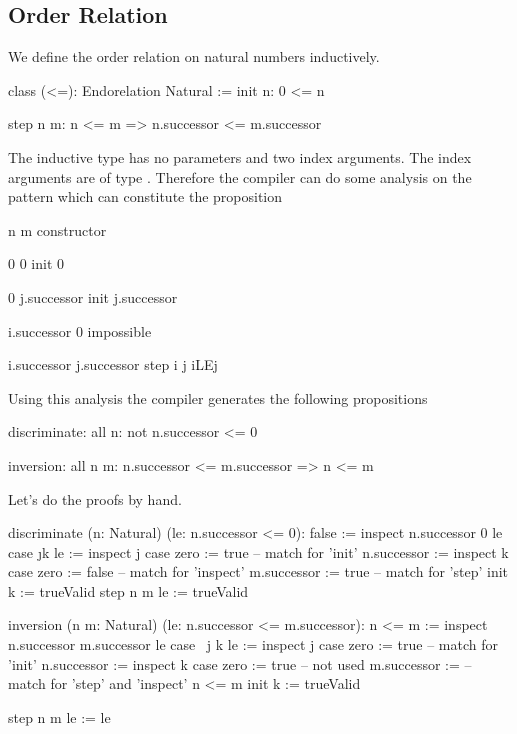 \subsection{Order Relation}

We define the order relation on natural numbers inductively.

\begin{alba}
    class
        (<=): Endorelation Natural
    :=
        init n:
            0 <= n

        step n m:
            n <= m
            => n.successor <= m.successor
\end{alba}

The inductive type has no parameters and two index arguments. The index
arguments are of type . Therefore the compiler can do some analysis
on the pattern which can constitute the proposition 

\begin{alba}
        n               m                   constructor

        0               0                   init 0

        0               j.successor         init j.successor

        i.successor     0                   impossible

        i.successor     j.successor         step i j iLEj
\end{alba}
%
Using this analysis the compiler generates the following propositions
\begin{alba}
    discriminate: all n: not n.successor <= 0

    inversion: all n m: n.successor <= m.successor => n <= m
\end{alba}

Let's do the proofs by hand.

\begin{alba}
    discriminate (n: Natural) (le: n.successor <= 0): false :=
        inspect
            n.successor
            0
            le
        case
            {\j k le :=
                inspect j case
                    zero := true -- match for 'init'
                    n.successor :=
                        inspect k case
                            zero := false       -- match for 'inspect'
                            m.successor := true -- match for 'step'
            }
            init k :=
                trueValid
            step n m le :=
                trueValid

    inversion (n m: Natural) (le: n.successor <= m.successor): n <= m
    :=
        inspect
            n.successor
            m.successor
            le
        case
            {\ j k le :=
                inspect j case
                    zero := true  -- match for 'init'
                    n.successor :=
                        inspect k case
                            zero := true    -- not used
                            m.successor :=  -- match for 'step' and 'inspect'
                                n <= m}
            init k :=
                trueValid

            step n m le :=
                le
\end{alba}


